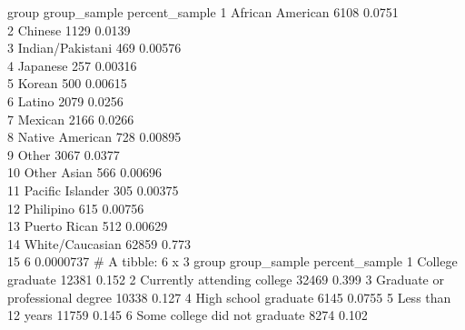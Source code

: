 \documentclass[
  english,
  man]{apa6}
\begin{document}
group group\_sample percent\_sample
1 African American 6108 0.0751\\
2 Chinese 1129 0.0139\\
3 Indian/Pakistani 469 0.00576\\
4 Japanese 257 0.00316\\
5 Korean 500 0.00615\\
6 Latino 2079 0.0256\\
7 Mexican 2166 0.0266\\
8 Native American 728 0.00895\\
9 Other 3067 0.0377\\
10 Other Asian 566 0.00696\\
11 Pacific Islander 305 0.00375\\
12 Philipino 615 0.00756\\
13 Puerto Rican 512 0.00629\\
14 White/Caucasian 62859 0.773\\
15 6 0.0000737
\# A tibble: 6 x 3
group group\_sample percent\_sample
1 College graduate 12381 0.152
2 Currently attending college 32469 0.399
3 Graduate or professional degree 10338 0.127
4 High school graduate 6145 0.0755
5 Less than 12 years 11759 0.145
6 Some college did not graduate 8274 0.102

\begingroup\fontsize{12}{14}\selectfont
\end{document}
